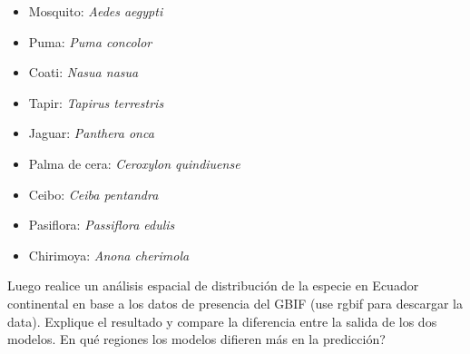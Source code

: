 \documentclass[
]{article}
\begin{document}
\begin{itemize}
\item
  Mosquito: \emph{Aedes aegypti}
\item
  Puma: \emph{Puma concolor}
\item
  Coati: \emph{Nasua nasua}
\item
  Tapir: \emph{Tapirus terrestris}
\item
  Jaguar: \emph{Panthera onca}
\item
  Palma de cera: \emph{Ceroxylon quindiuense}
\item
  Ceibo: \emph{Ceiba pentandra}
\item
  Pasiflora: \emph{Passiflora edulis}
\item
  Chirimoya: \emph{Anona cherimola}
\end{itemize}

Luego realice un análisis espacial de distribución de la especie en
Ecuador continental en base a los datos de presencia del GBIF (use rgbif
para descargar la data). Explique el resultado y compare la diferencia
entre la salida de los dos modelos. En qué regiones los modelos difieren
más en la predicción?
\end{document}
